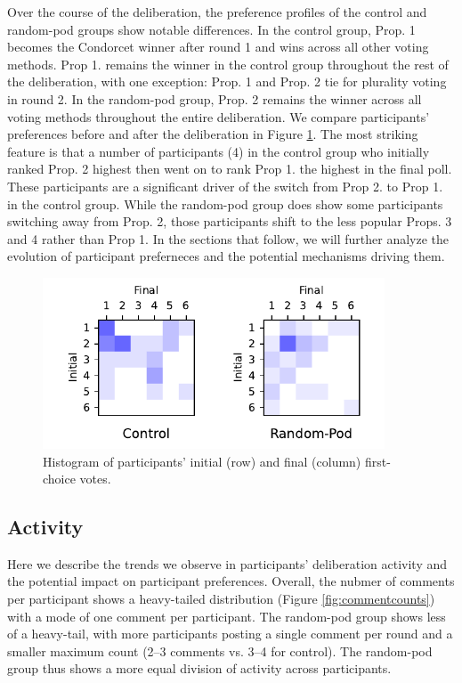 {Over the course of the deliberation, the preference profiles of the control and random-pod groups show notable differences.
In the control group, Prop. 1 becomes the Condorcet winner after round 1 and wins across all other voting methods.
Prop 1. remains the winner in the control group throughout the rest of the deliberation, with one exception: Prop. 1 and Prop. 2 tie for plurality voting in round 2.
In the random-pod group, Prop. 2 remains the winner across all voting methods throughout the entire deliberation.
We compare participants' preferences before and after the deliberation in Figure \ref{fig:countmatrix}.
The most striking feature is that a number of participants (4) in the control group who initially ranked Prop. 2 highest then went on to rank Prop 1. the highest in the final poll.
These participants are a significant driver of the switch from Prop 2. to Prop 1. in the control group.
While the random-pod group does show some participants switching away from Prop. 2, those participants shift to the less popular Props. 3 and 4 rather than Prop 1.
In the sections that follow, we will further analyze the evolution of participant preferneces and the potential mechanisms driving them.

\begin{figure}
    \centering
    \includegraphics[width=4in]{chapters/figures/NetDelibExp/fig-count-matrix.pdf}
    \caption{Histogram of participants' initial (row) and final (column) first-choice votes.}
    \label{fig:countmatrix}
\end{figure}


\subsection{Activity}
\label{sec:res-activity}

Here we describe the trends we observe in participants' deliberation activity and the potential impact on participant preferences.
Overall, the nubmer of comments per participant shows a heavy-tailed distribution (Figure \ref{fig:commentcounts}) with a mode of one comment per participant.
The random-pod group shows less of a heavy-tail, with more participants posting a single comment per round and a smaller maximum count (2--3 comments vs. 3--4 for control).
The random-pod group thus shows a more equal division of activity across participants.

}
